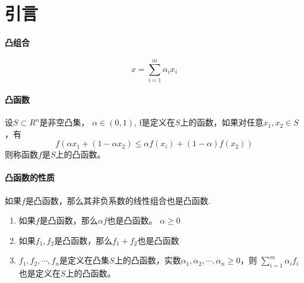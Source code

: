 \section{引言}
\paragraph{凸组合}
\begin{equation}
x = \sum_{i=1}^{m}{\alpha_i x_i}
\end{equation}

\paragraph{凸函数}
设$S\subset R^n$是非空凸集， $\alpha \in (0, 1)$, f是定义在$S$上的函数，如果对任意$x_1, x_2 \in S$，有
\begin{equation}
f(\alpha x_1 + (1-\alpha x_2) \le \alpha f(x_i) + (1-\alpha) f(x_2))
\end{equation}
则称函数$f$是$S$上的凸函数。
\paragraph{凸函数的性质}
如果$f$是凸函数，那么其非负系数的线性组合也是凸函数.
\begin{enumerate}
\item 如果$f$是凸函数，那么$\alpha f$也是凸函数。 $\alpha \ge 0$
\item 如果$f_1, f_2$是凸函数，那么$f_1 + f_2$也是凸函数
\item $f_1, f_2, \cdots, f_n$是定义在凸集$S$上的凸函数，实数$\alpha_1, \alpha_2, \cdots, \alpha_n \ge 0$，则
$\sum_{i=1}^{m}{\alpha_i f_i}$也是定义在$S$上的凸函数。
\end{enumerate}

